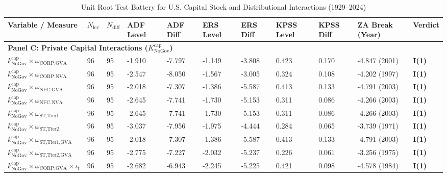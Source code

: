\documentclass[11pt,a4paper]{article}
\begin{document}
\begin{landscape}
\begin{table}[p]
\centering
\footnotesize
\caption{Unit Root Test Battery for U.S. Capital Stock and Distributional Interactions (1929--2024)}
\label{tab:urca_results_kcap}
\begin{tabular}{p{6.0cm} p{0.6cm} p{0.6cm} p{1.5cm} p{1.5cm} p{1.5cm} p{1.5cm} p{1.5cm} p{1.5cm} p{2.2cm} p{2.2cm}}
\toprule
\textbf{Variable / Measure} & \textbf{$N_{\text{lev}}$} & \textbf{$N_{\text{diff}}$} & \textbf{ADF Level} & \textbf{ADF Diff} & \textbf{ERS Level} & \textbf{ERS Diff} & \textbf{KPSS Level} & \textbf{KPSS Diff} & \textbf{ZA Break (Year)} & \textbf{Verdict} \\
\midrule
\multicolumn{11}{l}{\textbf{Panel C: Private Capital Interactions ($K^{\text{cap}}_{\text{NoGov}}$)}} \\
\midrule
$k^{\text{cap}}_{\text{NoGov}} \times \omega_{\text{CORP,GVA}}$ & 96 & 95 & -1.910 & -7.797 & -1.149 & -3.808 & 0.423 & 0.170 & -4.847 (2001) & \textbf{I(1)} \\
$k^{\text{cap}}_{\text{NoGov}} \times \omega_{\text{CORP,NVA}}$ & 96 & 95 & -2.547 & -8.050 & -1.567 & -3.005 & 0.324 & 0.108 & -4.202 (1997) & \textbf{I(1)} \\
$k^{\text{cap}}_{\text{NoGov}} \times \omega_{\text{NFC,GVA}}$ & 96 & 95 & -2.018 & -7.307 & -1.386 & -5.587 & 0.413 & 0.133 & -4.791 (2003) & \textbf{I(1)} \\
$k^{\text{cap}}_{\text{NoGov}} \times \omega_{\text{NFC,NVA}}$ & 96 & 95 & -2.645 & -7.741 & -1.730 & -5.153 & 0.311 & 0.086 & -4.266 (2003) & \textbf{I(1)} \\
$k^{\text{cap}}_{\text{NoGov}} \times \omega_{\text{ST,Tier1}}$ & 96 & 95 & -2.645 & -7.741 & -1.730 & -5.153 & 0.311 & 0.086 & -4.266 (2003) & \textbf{I(1)} \\
$k^{\text{cap}}_{\text{NoGov}} \times \omega_{\text{ST,Tier2}}$ & 96 & 95 & -3.037 & -7.956 & -1.975 & -4.444 & 0.284 & 0.065 & -3.739 (1971) & \textbf{I(1)} \\
$k^{\text{cap}}_{\text{NoGov}} \times \omega_{\text{ST,Tier1,GVA}}$ & 96 & 95 & -2.018 & -7.307 & -1.386 & -5.587 & 0.413 & 0.133 & -4.791 (2003) & \textbf{I(1)} \\
$k^{\text{cap}}_{\text{NoGov}} \times \omega_{\text{ST,Tier2,GVA}}$ & 96 & 95 & -2.775 & -7.227 & -2.032 & -5.237 & 0.226 & 0.061 & -3.256 (1975) & \textbf{I(1)} \\
$k^{\text{cap}}_{\text{NoGov}} \times \omega_{\text{CORP,GVA}} \times \iota_t$ & 96 & 95 & -2.682 & -6.943 & -2.245 & -5.225 & 0.421 & 0.098 & -4.578 (1984) & \textbf{I(1)} \\

\end{tabular}
\end{table}
\end{landscape}
\end{document}

